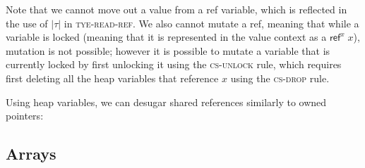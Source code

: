 \documentclass[acmsmall,nonacm]{acmart}
\newcommand*{\N}{\mathbb{N}}
\newcommand{\core}[1]{\left| #1 \right|}
\newcommand{\proves}{\vdash}
\newcommand{\makes}{\dashv}
\newcommand{\constep}{\proves\cdot\makes}
\newcommand*{\axiom}[2][]{\infer[#1]{}{#2}}
\begin{document}

Note that we cannot move out a value from a ref variable, which is reflected in the use of $\core\tau$ in \textsc{tye-read-ref}. We also cannot mutate a ref, meaning that while a variable is locked (meaning that it is represented in the value context as a $\mathsf{ref}^x\;x$), mutation is not possible; however it is possible to mutate a variable that is currently locked by first unlocking it using the \textsc{cs-unlock} rule, which requires first deleting all the heap variables that reference $x$ using the \textsc{cs-drop} rule.

Using heap variables, we can desugar shared references similarly to owned pointers:


\subsection{Arrays}\label{sec:arrays}
\end{document}
